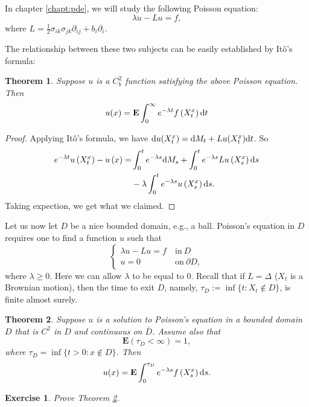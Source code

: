 \documentclass[twoside, 12pt]{book}
\numberwithin{equation}{chapter}
\newtheorem{theorem}{Theorem}[section]
\newtheorem{exercise}{Exercise}[section]
\def\bE{{\mathbf E}}
\def\geq{\geqslant}
\def\p{\partial}
\def\d{\text{\rm{d}}}
\begin{document}
	In chapter \ref{chapt:pde}, we will study the following Poisson equation: 
	\[
	    \lambda u - L u =f, 
	\]
	where $L=\frac{1}{2}\sigma_{ik}\sigma_{jk}\p_{ij}+b_i\p_i$. 
	
	The relationship between these two subjects can be easily established by It\^o's formula: 
	\begin{theorem}\label{thm:FK1}
		Suppose $u$ is a $C^2_b$ function satisfying the above Poisson equation. Then
		$$
		u(x)=\mathbf{E} \int_0^{\infty} e^{-\lambda t} f\left(X^x_t\right) \d t
		$$
	\end{theorem}
	\begin{proof}
		Applying It\^o's formula, we have 
		$\d u(X^x_t)=\d M_t + Lu(X^x_t) \d t$. So 
		\[
		    \begin{aligned}
		    	e^{-\lambda t} u\left(X_t^x\right)-u\left(x\right)=&\int_0^t e^{-\lambda s} \d M_s+\int_0^t e^{-\lambda s} L u\left(X^x_s\right) \d s \\
		    	&-\lambda \int_0^t e^{-\lambda s} u\left(X^x_s\right) \d s.
		    \end{aligned}
		\]
		Taking expection, we get what we claimed. 
	\end{proof}
	
	Let us now let $D$ be a nice bounded domain, e.g., a ball. Poisson's equation in $D$ requires one to find a function $u$ such that 
	\begin{equation*}
		\begin{cases}
			\lambda u- Lu=f ~&\mbox{in}~ D\\
			u=0 ~&\mbox{on}~ \p D, 
		\end{cases}
	\end{equation*}
	where $\lambda\geq 0$. Here we can allow $\lambda$ to be equal to $0$. Recall that if $L=\Delta$ ($X_t$ is a Brownian motion), then the time to exit $D$, namely, $\tau_D := \inf\{t : X_t \notin D\}$, is finite almost surely. 
	
	\begin{theorem}\label{thm:PR-Dir}
		Suppose $u$ is a solution to Poisson's equation in a bounded domain $D$ that is $C^2$ in $D$ and continuous on $\bar{D}$. Assume also that 
		\begin{equation*}%
			\bE(\tau_D<\infty)=1, 
		\end{equation*}
		where $\tau_D=\inf\{t>0: x\notin D\}$. Then
		\[
		    u(x)=\mathbf{E} \int_0^{\tau_D} e^{-\lambda s} f\left(X_s^x\right) \d s.		
		\]
	\end{theorem}
	\begin{exercise}
		Prove Theorem \ref{thm:PR-Dir}. 
	\end{exercise}
	
\end{document}
